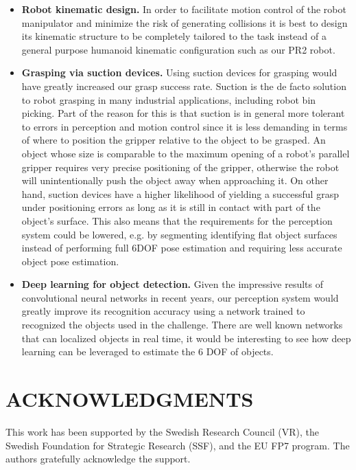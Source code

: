 \documentclass[letterpaper, 10pt, conference]{ieeeconf}
\begin{document}
\begin{itemize}
\item \textbf{Robot kinematic design.} In order to facilitate motion control of the robot manipulator   and minimize the risk of generating collisions it is best to design its kinematic
  structure to be completely tailored to the task instead of a general purpose humanoid kinematic configuration such as our PR2 robot. 
\item \textbf{Grasping via suction devices.} Using suction devices for grasping would have
  greatly increased our grasp success rate. Suction is the de facto solution
  to robot grasping in many industrial applications, including robot bin picking.
  Part of the reason for this is that suction
  is in general more tolerant to errors in perception and motion control since it is less demanding
  in terms of where to position the gripper relative to the object to be grasped. An object whose size is comparable to the maximum opening of a robot's parallel gripper requires very precise
  positioning of the gripper,  otherwise the robot will unintentionally push the object away when approaching it. On other hand, suction devices have a higher likelihood of yielding a successful grasp under positioning errors as long as it is still in contact with part of the
  object's surface. This also means that the requirements for the perception system could be
  lowered, e.g. by segmenting identifying flat object surfaces instead of performing full 6DOF pose estimation and requiring less accurate object pose estimation. 
 \item \textbf{Deep learning for object detection.} Given the impressive results of convolutional neural networks in recent years, our perception system would greatly improve its recognition accuracy using a network trained to recognized the objects used in the challenge. There are well known networks that can localized objects in real time, it would be interesting to see how deep learning can be leveraged to estimate the 6 DOF of objects.
\end{itemize}



\section*{ACKNOWLEDGMENTS}

{This work has been supported by the Swedish Research Council (VR), the Swedish Foundation for Strategic Research (SSF), and the EU FP7 program. The authors gratefully acknowledge the support.}



\end{document}
